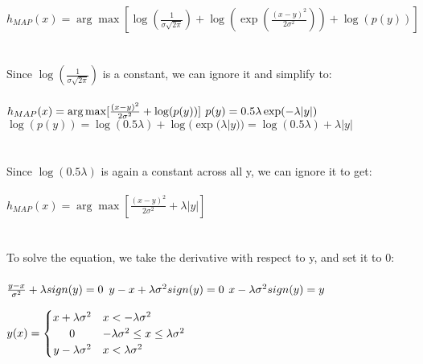 \documentclass[paper=a4, fontsize=11pt]{scrartcl} %
\numberwithin{equation}{section} %
\numberwithin{figure}{section} %
\numberwithin{table}{section} %
\begin{document}
	$h_{MAP}(x) = \arg\max [\log(\frac{1}{\sigma\sqrt{2\pi}}) + \log(\exp(\frac{(x-y)^2}{2\sigma^2})) + \log(p(y))]$
	\\\\\\Since $\log(\frac{1}{\sigma\sqrt{2\pi}})$ is a constant, we can ignore it and simplify to:\\\\
	$h_{MAP}(x) = \arg \max [\frac{(x-y)^2}{2\sigma^2} + \log(p(y))]\\\\$
	$p(y) = 0.5\lambda\exp(-\lambda|y|)\\\\$
	$\log(p(y)) = \log(0.5\lambda) + \log(\exp(\lambda|y)) = \log(0.5\lambda) + \lambda|y|$
	\\\\\\Since $\log(0.5\lambda)$ is again a constant across all y, we can ignore it to get:\\\\
	$h_{MAP}(x) = \arg\max[\frac{(x-y)^2}{2\sigma^2} + \lambda|y|]$
	\\\\\\To solve the equation, we take the derivative with respect to y, and set it to 0:\\\\
	$\frac{y-x}{\sigma^2} + \lambda sign(y) = 0\\\\$
	$y-x + \lambda\sigma^2 sign(y) = 0\\\\$
	$x - \lambda\sigma^2 sign(y) = y\\\\\\\\$
	
	$
	y(x) = 
	\begin{cases}
		\hfill x + \lambda\sigma^2 \hfill & x < -\lambda\sigma^2 \\
		\hfill 0 \hfill & -\lambda\sigma^2 \leq x \leq \lambda\sigma^2\\
		\hfill y - \lambda\sigma^2 & x < \lambda\sigma^2\\
	\end{cases}
	$
	\newpage

	
\end{document}
